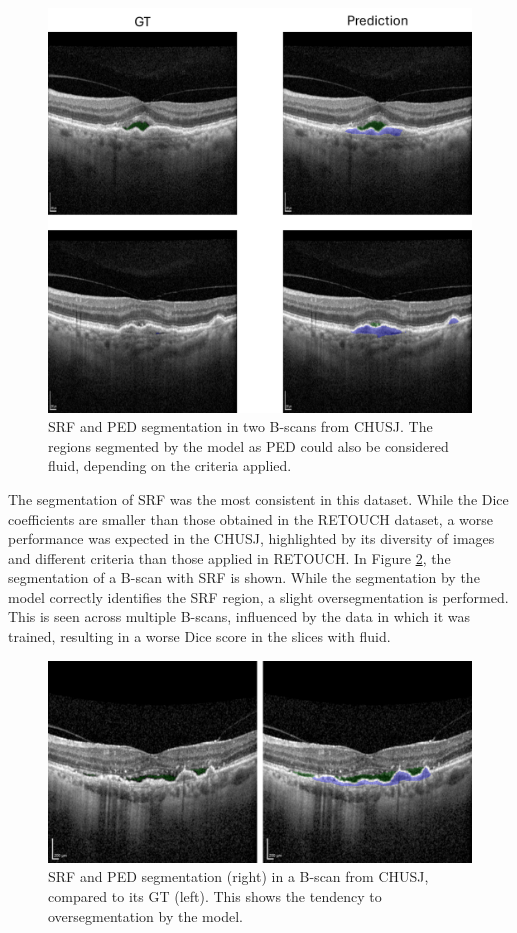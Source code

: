 \begin{figure}[!ht]
	\centering
	\includegraphics[width=0.65\linewidth]{figures/CHUSJPEDSegmentation.png}
	\caption{SRF and PED segmentation in two B-scans from CHUSJ. The regions segmented by the model as PED could also be considered fluid, depending on the criteria applied.}
	\label{fig:CHUSJPEDSegmentation}
\end{figure}

The segmentation of SRF was the most consistent in this dataset. While the Dice coefficients are smaller than those obtained in the RETOUCH dataset, a worse performance was expected in the CHUSJ, highlighted by its diversity of images and different criteria than those applied in RETOUCH. In Figure \ref{fig:CHUSJSRFSegmentation}, the segmentation of a B-scan with SRF is shown. While the segmentation by the model correctly identifies the SRF region, a slight oversegmentation is performed. This is seen across multiple B-scans, influenced by the data in which it was trained, resulting in a worse Dice score in the slices with fluid.

\begin{figure}[!ht]
	\centering
	\includegraphics[width=0.60\linewidth]{figures/CHUSJSRFSegmentation.png}
	\caption{SRF and PED segmentation (right) in a B-scan from CHUSJ, compared to its GT (left). This shows the tendency to oversegmentation by the model.}
	\label{fig:CHUSJSRFSegmentation}
\end{figure}

